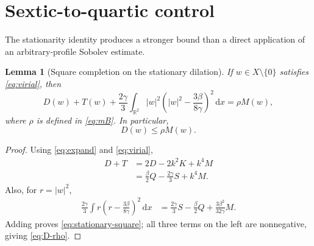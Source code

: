 \documentclass[11pt,letterpaper]{article}
\numberwithin{equation}{section}
\newtheorem{lemma}[theorem]{Lemma}
\newcommand{\RR}{\mathbb R}
\newcommand{\abs}[1]{\left\lvert #1\right\rvert}
\newcommand{\dd}{\,\mathrm d}
\begin{document}
\section{Sextic-to-quartic control}

The stationarity identity produces a stronger bound than a direct application of an arbitrary-profile Sobolev estimate.

\begin{lemma}[Square completion on the stationary dilation]\label{lem:D-bound}
If $w\in X\setminus\{0\}$ satisfies \eqref{eq:virial}, then
\begin{equation}\label{eq:stationary-square}
 D(w)+T(w)+\frac{2\gamma}{3}\int_{\RR^2}
  \abs{w}^2\left(\abs{w}^2-\frac{3\beta}{8\gamma}\right)^2\dd x
 =\rho M(w),
\end{equation}
where $\rho$ is defined in \eqref{eq:mB}. In particular,
\begin{equation}\label{eq:D-rho}
 D(w)\le\rho M(w).
\end{equation}
\end{lemma}
\begin{proof}
Using \eqref{eq:expand} and \eqref{eq:virial},
\[
 \begin{aligned}
 D+T&=2D-2k^2K+k^4M\\
 &=\frac\beta2 Q-\frac{2\gamma}{3}S+k^4M.
 \end{aligned}
\]
Also, for $r=\abs w^2$,
\[
 \begin{aligned}
 \frac{2\gamma}{3}\int r\left(r-\frac{3\beta}{8\gamma}\right)^2\dd x
 &=\frac{2\gamma}{3}S-\frac\beta2 Q
   +\frac{3\beta^2}{32\gamma}M.
 \end{aligned}
\]
Adding proves \eqref{eq:stationary-square}; all three terms on the left are nonnegative, giving \eqref{eq:D-rho}.
\end{proof}
\end{document}
